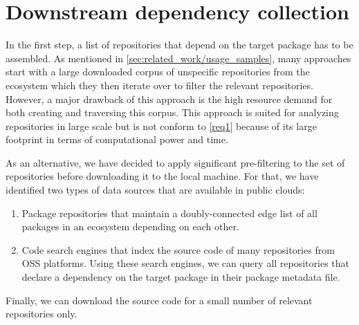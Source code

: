 \section{Downstream dependency collection}
\label{sec:dependency_collection}

In the first step, a list of repositories that depend on the target package has to be assembled.
As mentioned in \cref{sec:related_work/usage_samples}, many approaches start with a large downloaded corpus of unspecific repositories from the ecosystem which they then iterate over to filter the relevant repositories.
However, a major drawback of this approach is the high resource demand for both creating and traversing this corpus.
This approach is suited for analyzing repositories in large scale but is not conform to \cref{req1} because of its large footprint in terms of computational power and time.

As an alternative, we have decided to apply significant pre-filtering to the set of repositories before downloading it to the local machine.
For that, we have identified two types of data sources that are available in public clouds:

\begin{enumerate}[label=(\roman*)]
	\item Package repositories that maintain a doubly-connected edge list of all packages in an ecosystem depending on each other.
	\item Code search engines that index the source code of many repositories from OSS platforms.
		Using these search engines, we can query all repositories that declare a dependency on the target package in their package metadata file.
\end{enumerate}

Finally, we can download the source code for a small number of relevant repositories only.
